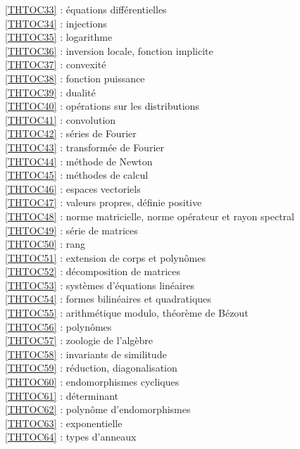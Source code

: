 \ref {THTOC33} : équations différentielles\\
\ref {THTOC34} : injections\\
\ref {THTOC35} : logarithme\\
\ref {THTOC36} : inversion locale, fonction implicite\\
\ref {THTOC37} : convexité\\
\ref {THTOC38} : fonction puissance\\
\ref {THTOC39} : dualité\\
\ref {THTOC40} : opérations sur les distributions\\
\ref {THTOC41} : convolution\\
\ref {THTOC42} : séries de Fourier\\
\ref {THTOC43} : transformée de Fourier\\
\ref {THTOC44} : méthode de Newton\\
\ref {THTOC45} : méthodes de calcul\\
\ref {THTOC46} : espaces vectoriels\\
\ref {THTOC47} : valeurs propres, définie positive\\
\ref {THTOC48} : norme matricielle, norme opérateur et rayon spectral\\
\ref {THTOC49} : série de matrices\\
\ref {THTOC50} : rang\\
\ref {THTOC51} : extension de corps et polynômes\\
\ref {THTOC52} : décomposition de matrices\\
\ref {THTOC53} : systèmes d'équations linéaires\\
\ref {THTOC54} : formes bilinéaires et quadratiques\\
\ref {THTOC55} : arithmétique modulo, théorème de Bézout\\
\ref {THTOC56} : polynômes\\
\ref {THTOC57} : zoologie de l'algèbre\\
\ref {THTOC58} : invariants de similitude\\
\ref {THTOC59} : réduction, diagonalisation\\
\ref {THTOC60} : endomorphismes cycliques\\
\ref {THTOC61} : déterminant\\
\ref {THTOC62} : polynôme d'endomorphismes\\
\ref {THTOC63} : exponentielle\\
\ref {THTOC64} : types d'anneaux\\
